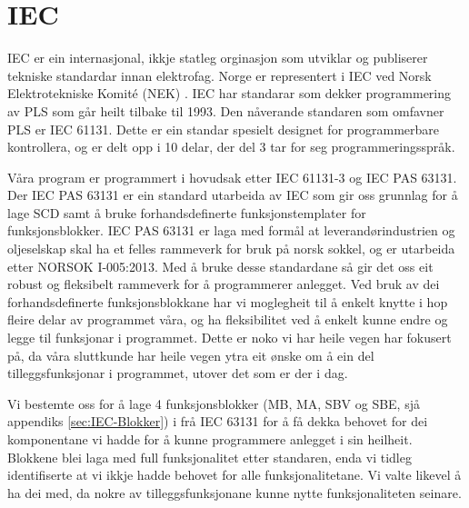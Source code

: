 \section{IEC}
\thispagestyle{fancy}


\gls{IEC} \citep{IEC} er ein internasjonal, ikkje statleg orginasjon som utviklar og publiserer tekniske standardar innan elektrofag. 
Norge er representert i IEC ved Norsk Elektrotekniske Komité (NEK) \citep{IEC-SNL}. 
IEC har standarar som dekker programmering av PLS som går heilt tilbake til 1993\citep{Wiki-93}. 
Den nåverande standaren som omfavner PLS er IEC 61131\citep{IEC-61131}. Dette er ein standar spesielt designet for programmerbare kontrollera, og er delt opp i 10 delar, der del 3 tar for seg programmeringsspråk. 

Våra program er programmert i hovudsak etter IEC 61131-3 og IEC \gls{PAS} 63131\citep{IEC-63131}. 
Der IEC PAS 63131 er ein standard utarbeida av IEC som gir oss grunnlag for å lage \gls{SCD} samt å bruke forhandsdefinerte funksjonstemplater for funksjonsblokker. 
IEC PAS 63131 er laga med formål at leverandørindustrien og oljeselskap skal ha et felles rammeverk for bruk på norsk sokkel, og er utarbeida etter NORSOK I-005:2013.
Med å bruke desse standardane så gir det oss eit robust og fleksibelt rammeverk for å programmerer anlegget. 
Ved bruk av dei forhandsdefinerte funksjonsblokkane har vi moglegheit til å enkelt knytte i hop fleire delar av programmet våra, og ha fleksibilitet ved å enkelt kunne endre og legge til funksjonar i programmet. 
Dette er noko vi har heile vegen har fokusert på, da våra sluttkunde har heile vegen ytra eit ønske om å ein del tilleggsfunksjonar i programmet, utover det som er der i dag. 

Vi bestemte oss for å lage 4 funksjonsblokker (MB, MA, SBV og SBE, sjå appendiks \ref{sec:IEC-Blokker})  
i frå IEC 63131 for å få dekka behovet for dei komponentane vi hadde for å kunne programmere anlegget i sin heilheit. 
Blokkene blei laga med full funksjonalitet etter standaren, enda vi tidleg identifiserte at vi ikkje hadde behovet for alle funksjonalitetane. Vi valte likevel å ha dei med, da nokre av tilleggsfunksjonane kunne nytte funksjonaliteten seinare.
\newpage

